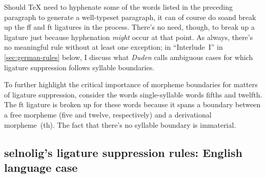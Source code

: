\documentclass[11pt]{article}
\newcommand{\pkg}[1]{\textsf{#1}}
\begin{document}
Should TeX need to hyphenate some of the words listed in the preceding paragraph to generate a well-typeset paragraph, it can of course do so\textemdash and break up the ff and ft ligatures in the process. There's no need, though, to break up a ligature just because hyphenation \emph{might} occur at that point. As always, there's no meaningful rule without at least one exception; in \enquote{Interlude~I} in \cref{sec:german-rules} below, I discuss what \emph{Duden} calls ambiguous cases for  which ligature suppression follows syllable boundaries.

To further highlight the critical importance of morpheme boundaries for matters of ligature suppression, consider the words single-syllable words fifths and twelfth. The ft ligature is broken up for these words because it spans a boundary between a free morpheme (five and twelve, respectively) and a derivational morpheme~(th). The fact that there's no syllable boundary is immaterial.

 



\subsection[selnolig's ligature suppression rules: English language case]{\pkg{selnolig}'s ligature suppression rules: English language case} \label{sec:english-rules}
\end{document}
